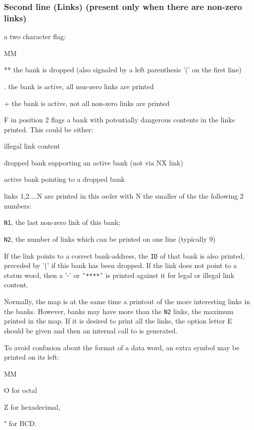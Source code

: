 \subsubsection{Second line (Links) (present only when there are non-zero links)}
\begin{OL}
\item a two character flag:
\begin{DL}{MM}
\item[**]the bank is dropped (also signaled by a left parenthesis '('
on the first line)
\item[.]the bank is active, all non-zero links are printed
\item[+]the bank is active, not all non-zero links are printed
\item[F]in position 2 flags a bank with potentially dangerous
contents in the links printed. This could be either:
\begin{UL}
\item illegal link content
\item dropped bank supporting an active bank (not via NX link)
\item active bank pointing to a dropped bank
\end{UL}
\end{DL}
\item links 1,2....N are printed in this order with N the smaller of the
the following 2 numbers:
\begin{UL}
\item {\tt N1}, the last non-zero link of this bank;
\item {\tt N2}, the number of links which can be printed on one line
(typically 9)
\end{UL}
If the link points to a correct bank-address, the {\tt ID} of that
bank is also printed, preceded by '(' if this bank has been dropped.
If the link does not point to a status word, then a '-' or
{\tt'****'} is printed against it for legal or illegal link content.
\end{OL}
\par Normally, the map is at the same time a printout of the more
interesting links in the banks.
However, banks may have more than the {\tt N2} links,
the maximum printed in the map.
If it is desired to print all the links,
the option letter E should be given and
then an internal  call to  is generated.
\par To avoid confusion about the format of a data word,
an extra symbol may be printed on its left:
\begin{DL}{MM}
\item[ O]for octal
\item[ Z]for hexadecimal,
\item[ "]for BCD.
\end{DL}
